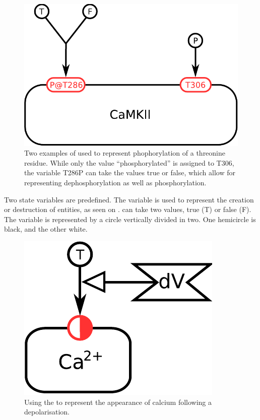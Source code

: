 \begin{figure}[H]
  \centering
  \includegraphics[scale = 0.5]{examples/ex-stateVariable}
  \caption{Two examples of  used to represent phophorylation of a threonine residue. While only the value ``phosphorylated'' is assigned to T306, the variable T286P can take the values true or false, which allow for representing dephosphorylation as well as phosphorylation.}
  \label{fig:ex-state-Variable}
\end{figure}

Two state variables are predefined. The variable  is used to represent the creation or destruction of entities, as seen on \label{sec:existence}.  can take two values, true (T) or false (F). The variable is represented by a circle vertically divided in two. One hemicircle is black, and the other white. 

\begin{figure}[H]
  \centering
  \includegraphics[scale = 0.5]{examples/ex-existence}
  \caption{Using the   to represent the appearance of calcium following a depolarisation.}
  \label{fig:ex-existence}
\end{figure}

